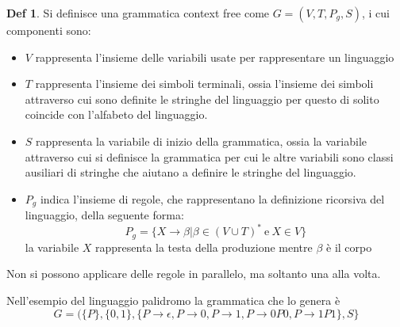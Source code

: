\documentclass[a4paper]{book}
\theoremstyle{definition}%
\newtheorem*{defi}{Def}%
\begin{document}
\begin{defi}
  Si definisce una grammatica context free come $G = (V, T, P_g, S)$, i cui componenti sono:
  \begin{itemize}
  \item $V$ rappresenta l'insieme delle variabili usate per rappresentare un linguaggio
  \item $T$ rappresenta l'insieme dei simboli terminali, ossia l'insieme dei simboli attraverso cui sono definite le stringhe
    del linguaggio per questo di solito coincide con l'alfabeto del linguaggio.

  \item $S$ rappresenta la variabile di inizio della grammatica, ossia la variabile attraverso cui si definisce la grammatica
    per cui le altre variabili sono classi ausiliari di stringhe che aiutano a definire le stringhe del linguaggio.

  \item $P_g$ indica l'insieme di regole, che rappresentano la definizione ricorsiva del linguaggio, della seguente forma:
    \begin{equation*}
        P_g = \{ X \to \beta | \beta \in (V \cup  T)^* \ \text{e} \ X \in V\}
    \end{equation*}
    la variabile $X$ rappresenta la testa della produzione mentre $\beta$ è il corpo
  \end{itemize}
  Non si possono applicare delle regole in parallelo, ma soltanto una alla volta.
\end{defi}

  Nell'esempio del linguaggio palidromo la grammatica che lo genera è
  \begin{equation*}
    G = (\{P\},\{0, 1\}, \{P \to \epsilon,P \to 0,P \to 1,P \to 0P0,P \to 1P1\}, S\}
  \end{equation*}
\end{document}
